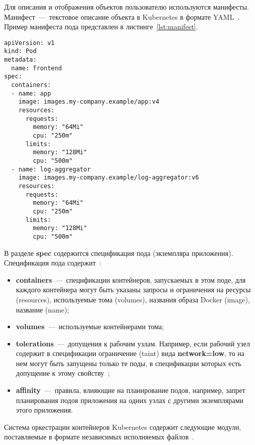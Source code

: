 Для описания и отображения объектов пользователю используются манифесты. Манифест~---~текстовое описание объекта в Kubernetes в формате YAML~\cite{kubernetesresources}. Пример манифеста пода представлен в листинге~\ref{lst:manifest}.

\begin{lstlisting}[label=lst:manifest, caption={Пример манифеста пода}]
apiVersion: v1
kind: Pod
metadata:
  name: frontend
spec:
  containers:
  - name: app
    image: images.my-company.example/app:v4
    resources:
      requests:
        memory: "64Mi"
        cpu: "250m"
      limits:
        memory: "128Mi"
        cpu: "500m"
  - name: log-aggregator
    image: images.my-company.example/log-aggregator:v6
    resources:
      requests:
        memory: "64Mi"
        cpu: "250m"
      limits:
        memory: "128Mi"
        cpu: "500m"
\end{lstlisting}

В разделе \textbf{spec} содержится спецификация пода (экземпляра приложения). Спецификация пода содержит~\cite{pods}:

\begin{itemize}
\item \textbf{containers}~---~спецификации контейнеров, запускаемых в этом поде, для каждого контейнера могут быть указаны запросы и ограничения на ресурсы (resources), используемые тома (volumes), названия образа Docker (image), название (name);
\item \textbf{volumes}~---~используемые контейнерами тома;
\item \textbf{tolerations}~---~допущения к рабочим узлам. Например, если рабочий узел содержит в спецификации ограничение (taint) вида \textbf{network=low}, то на нем могут быть запущены только те поды, в спецификации которых есть допущение к этому свойству~\cite{taints};
\item \textbf{affinity}~---~правила, влияющие на планирование подов, например, запрет планирования подов приложения на одних узлах с другими экземплярами этого приложения.
\end{itemize}


Система оркестрации контейнеров Kubernetes содержит следующие модули, поставляемые в формате независимых исполняемых файлов~\cite{kubearch}.

